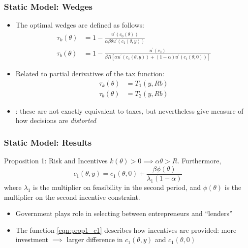 \documentclass{beamer}
\begin{document}
\begin{frame}
    \frametitle{Static Model: Wedges}

    \begin{itemize}
        \item The optimal wedges are defined as follows:
        \begin{align}
            \tau_{k}\left(\theta\right) &= 1-\frac{u^{\prime}\left(c_{0}\left(\theta\right)\right)}{\alpha\beta\theta u^{\prime}\left(c_{1}\left(\theta,y\right)\right)} \\
            \tau_{b}\left(\theta\right) &= 1-\frac{u^{\prime}\left(c_{0}\right)}{\beta R\left[\alpha u^{\prime}\left(c_{1}\left(\theta,y\right)\right)+\left(1-\alpha\right)u^{\prime}\left(c_{1}\left(\theta,0\right)\right)\right]}
        \end{align}
        \item Related to partial derivatives of the tax function:
        \begin{align*}
            \tau_k\left( \theta \right) &= T_1\left( y,Rb \right) \\
            \tau_b\left( \theta \right) &= T_2\left( y,Rb \right)
        \end{align*} 
        \item \cite{kocherlakota2005zero}: these are not exactly equivalent to taxes, but nevertheless give measure of how decisions are \textit{distorted}
    \end{itemize}

\end{frame}

\begin{frame}
    \frametitle{Static Model: Results}

    \begin{block}{Proposition 1: Risk and Incentives}
        \( k\left( \theta \right) > 0 \implies \alpha\theta>R \). Furthermore, 
        \begin{equation}
            c_1\left( \theta,y \right) = c_1\left( \theta,0 \right) + \frac{\beta\phi\left( \theta \right)}{\lambda_1\left( 1-\alpha \right)} \label{eqn:prop1_c1}
        \end{equation}
        where \( \lambda_1 \) is the multiplier on feasibility in the second period, and \( \phi\left( \theta \right) \) is the multiplier on the second incentive constraint.
    \end{block}
    \begin{itemize}
        \item Government plays role in selecting between entrepreneurs and ``lenders''
        \item The function \eqref{eqn:prop1_c1} describes how incentives are provided: more investment \( \implies \) larger difference in \( c_1\left( \theta,y \right) \) and \( c_1\left( \theta,0 \right) \)
    \end{itemize}

\end{frame}
\end{document}
